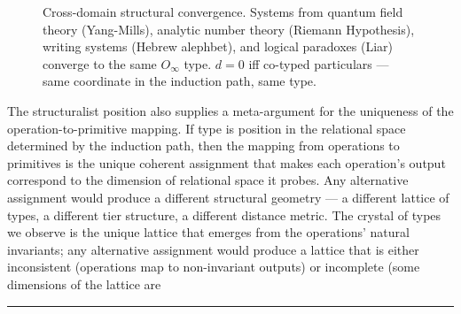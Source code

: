 \documentclass[12pt,a4paper]{article}
\makeatletter
\renewcommand{\_}{\ig@origunderscore\discretionary{}{}{}}
\makeatother
\begin{document}
\begin{figure}[htbp]
{
}

\caption{Cross-domain structural convergence. Systems from quantum field theory (Yang-Mills), analytic number theory (Riemann Hypothesis), writing systems (Hebrew alephbet), and logical paradoxes (Liar) converge to the same $O_{\infty}$ type. $d = 0$ iff co-typed particulars --- same coordinate in the induction path, same type.}
\label{fig:cross-domain-convergence}
\end{figure}

The structuralist position also supplies a meta-argument for the uniqueness of the
operation-to-primitive mapping. If
type is position in the relational space determined by the induction path, then the mapping from operations
to primitives is the unique coherent assignment that makes each operation's output correspond to the dimension of
relational space it probes. Any alternative assignment would produce a different structural geometry
--- a different
lattice of types, a different tier structure, a different distance metric. The crystal of types we observe is the
unique lattice that emerges from the operations' natural invariants; any alternative assignment would produce a lattice
that is either inconsistent (operations map to non-invariant outputs) or incomplete (some dimensions of the lattice are

\begin{center}
\rule{0.5\textwidth}{0.4pt}
\end{center}
\end{document}
